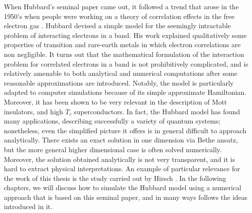When Hubbard's seminal paper came out, it followed a trend that arose in the 1950's when people were working on a theory of correlation effects in the free electron gas \cite{Bohm1953, Gell-Mann1957, Sawada1957, Hubbard1957, Hubbard1958, Nozieres1958}. Hubbard devised a simple model for the seemingly intractable problem of interacting electrons in a band. His work explained qualitatively some properties of transition and rare-earth metals in which electron correlations are non negligible. It turns out that the mathematical formulation of the interaction problem for correlated electrons in a band is not prohibitively complicated, and is relatively amenable to both analytical and numerical computations after some reasonable approximations are introduced. Notably, the model is particularly adapted to computer simulations because of its simple approximate Hamiltonian. Moreover, it has been shown to be very relevant in the description of Mott insulators, and high $T_c$ superconductors. In fact, the Hubbard model has found many applications, describing successfully a variety of quantum systems\cite{Editorial2013}; nonetheless, even the simplified picture it offers is in general difficult to approach analytically. There exists an exact solution in one dimension via Bethe ansatz\cite{Lieb1968}, but the more general higher dimensional case is often solved numerically.  Moreover, the solution obtained analytically is not very transparent, and it is hard to extract physical interpretations. An example of particular relevance for the work of this thesis is the study carried out by Hirsch \cite{Hirsch1985}. In the following chapters, we will discuss how to simulate the Hubbard model using a numerical approach that is based on this seminal paper, and in many ways follows the ideas introduced in it.

